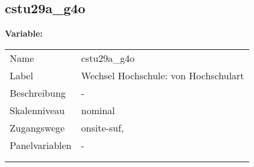	
	
	\subsection{cstu29a\_g4o}
	\label{subSection:cstu29a_g4o}

	\noindent\textbf{Variable:}\\
		\begin{tabular}{lL{11.3cm}}
			\label{tableVariable:cstu29a_g4o}
			Name & cstu29a\_g4o \\
			Label & Wechsel Hochschule: von Hochschulart \\
			Beschreibung & - \\
			Skalenniveau & nominal \\
			Zugangswege &
				onsite-suf,
 \\
			Panelvariablen & -
			 \\
			 \\
 \\
		\end{tabular}






